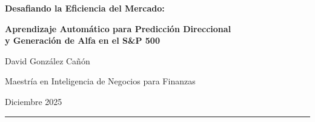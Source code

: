\documentclass[11pt,a4paper]{article}
\begin{document}
\thispagestyle{empty}
\begin{center}

\vspace*{0.8cm}

{\LARGE\bfseries Desafiando la Eficiencia del Mercado:\par}
\vspace{0.5cm}
{\Large\bfseries Aprendizaje Autom\'atico para Predicci\'on Direccional\\ y Generaci\'on de Alfa en el S\&P 500\par}

\vspace{1.2cm}

{\large David Gonz\'alez Ca\~n\'on\par}
\vspace{0.4cm}
{\normalsize Maestr\'ia en Inteligencia de Negocios para Finanzas\par}
\vspace{0.2cm}
{\normalsize Diciembre 2025\par}

\vspace{1.2cm}

\noindent\rule{0.9\textwidth}{0.5pt}

\vspace{0.8cm}

\end{center}
\end{document}
